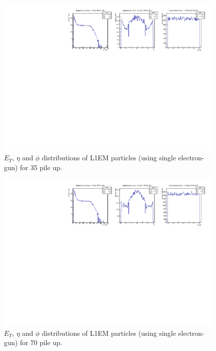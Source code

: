 \begin{figure}[!htb]
  \centering
  \includegraphics[scale=0.8]{../SimulationTools/L1EM_EtEtaPhi_35PileUP.pdf}
  \caption{$E_{T}$, $\eta$ and $\phi$ distributions of L1EM particles (using single electron-gun) for 35 pile up.}
  \label{fig:L1EM_EtEtaPhi_35PileUP}
\end{figure}

\begin{figure}[!htb]
  \centering
  \includegraphics[scale=0.8]{../SimulationTools/L1EM_EtEtaPhi_70PileUP.pdf}
  \caption{$E_{T}$, $\eta$ and $\phi$ distributions of L1EM particles (using single electron-gun) for 70 pile up.}
  \label{fig:L1EM_EtEtaPhi_70PileUP}
\end{figure}

